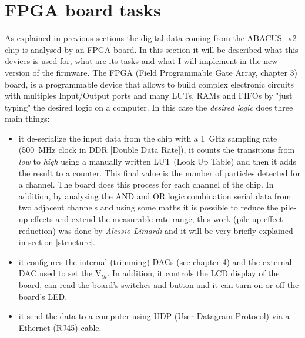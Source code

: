\section{FPGA board tasks}
\noindent As explained in previous sections the digital data coming from the ABACUS\_v2 chip is analysed by an FPGA board. In this section it will be described what this devices is used for, what are its tasks and what I will implement in the new version of the firmware.
The FPGA (Field Programmable Gate Array, chapter 3) board, is a programmable device that allows to build complex electronic circuits with multiples Input/Output ports and many LUTs, RAMs and FIFOs by "just typing" the desired logic on a computer.
In this case the \textit{desired logic} does three main things: 
\begin{itemize}
	\item it de-serialize the input data from the chip with a 1~GHz sampling rate (500~MHz clock in DDR [Double Data Rate]), it counts the transitions from \textit{low} to \textit{high} using a manually written LUT (Look Up Table) and then it adds the result to a counter. This final value is the number of particles detected for a channel. The board does this process for each channel of the chip. In addition, by analysing the AND and OR logic combination serial data from two adjacent channels and using some maths it is possible to reduce the pile-up effects and extend the measurable rate range; this work (pile-up effect reduction) was done by \textit{Alessio Limardi} and it will be very briefly explained in section \ref{structure}.    
	\item it configures the internal (trimming) DACs (see chapter 4) and the external DAC used to set the V$_{th}$. In addition, it controls the LCD display of the board, can read the board's switches and button and it can turn on or off the board's LED. 
	\item it send the data to a computer using UDP (User Datagram Protocol) via a Ethernet (RJ45) cable.  
\end{itemize}
















